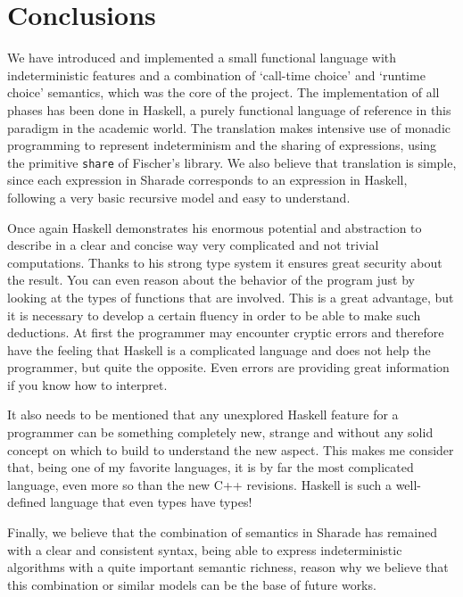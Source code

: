 \documentclass[class=article, crop=false]{standalone}
\begin{document}
\section{Conclusions}
We have introduced and implemented a small functional language with indeterministic features
and a combination of `call-time choice' and `runtime choice' semantics, which was the core of
the project. The implementation of all phases has been done in Haskell, a purely functional
language of reference in this paradigm in the academic world. The translation makes intensive
use of monadic programming to represent indeterminism and the sharing of expressions, using
the primitive \verb`share` of Fischer's library. We also believe that translation is simple,
since each expression in Sharade corresponds to an expression in Haskell, following a very
basic recursive model and easy to understand.

Once again Haskell demonstrates his enormous potential and abstraction to describe in a clear
and concise way very complicated and not trivial computations. Thanks to his strong type
system it ensures great security about the result. You can even reason about the behavior of
the program just by looking at the types of functions that are involved. This is a great
advantage, but it is necessary to develop a certain fluency in order to be able to make such
deductions. At first the programmer may encounter cryptic errors and therefore have the
feeling that Haskell is a complicated language and does not help the programmer, but quite
the opposite. Even errors are providing great information if you know how to interpret.

It also needs to be mentioned that any unexplored Haskell feature for a programmer can be
something completely new, strange and without any solid concept on which to build to
understand the new aspect. This makes me consider that, being one of my favorite languages,
it is by far the most complicated language, even more so than the new C++ revisions. Haskell
is such a well-defined language that even types have types!

Finally, we believe that the combination of semantics in Sharade has remained with a clear
and consistent syntax, being able to express indeterministic algorithms with a quite
important semantic richness, reason why we believe that this combination or similar models
can be the base of future works.
\end{document}
